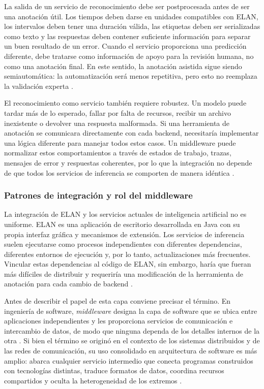 La salida de un servicio de reconocimiento debe ser postprocesada antes de ser una anotación útil. Los tiempos deben darse en unidades compatibles con ELAN, los intervalos deben tener una duración válida, las etiquetas deben ser serializadas como texto y las respuestas deben contener suficiente información para separar un buen resultado de un error. Cuando el servicio proporciona una predicción diferente, debe tratarse como información de apoyo para la revisión humana, no como una anotación final. En este sentido, la anotación asistida sigue siendo semiautomática: la automatización será menos repetitiva, pero esto no reemplaza la validación experta \cite{auer2010elan}.

El reconocimiento como servicio también requiere robustez. Un modelo puede tardar más de lo esperado, fallar por falta de recursos, recibir un archivo inexistente o devolver una respuesta malformada. Si una herramienta de anotación se comunicara directamente con cada backend, necesitaría implementar una lógica diferente para manejar todos estos casos. Un middleware puede normalizar estos comportamientos a través de estados de trabajo, trazas, mensajes de error y respuestas coherentes, por lo que la integración no depende de que todos los servicios de inferencia se comporten de manera idéntica \cite{fastapi2026features,pydantic2026models}.

\subsubsection{Patrones de integración y rol del middleware}

La integración de ELAN y los servicios actuales de inteligencia artificial no es uniforme. ELAN es una aplicación de escritorio desarrollada en Java con su propia interfaz gráfica y mecanismos de extensión. Los servicios de inferencia suelen ejecutarse como procesos independientes con diferentes dependencias, diferentes entornos de ejecución y, por lo tanto, actualizaciones más frecuentes. Vincular estas dependencias al código de ELAN, sin embargo, haría que fueran más difíciles de distribuir y requeriría una modificación de la herramienta de anotación para cada cambio de backend \cite{dragoni2017microservices}.

Antes de describir el papel de esta capa conviene precisar el término. En ingeniería de software, \textit{middleware} designa la capa de software que se ubica entre aplicaciones independientes y les proporciona servicios de comunicación e intercambio de datos, de modo que ninguna dependa de los detalles internos de la otra \cite{bernstein1996middleware}. Si bien el término se originó en el contexto de los sistemas distribuidos y de las redes de comunicación, su uso consolidado en arquitectura de software es más amplio: abarca cualquier servicio intermedio que conecta programas construidos con tecnologías distintas, traduce formatos de datos, coordina recursos compartidos y oculta la heterogeneidad de los extremos \cite{bernstein1996middleware}.

